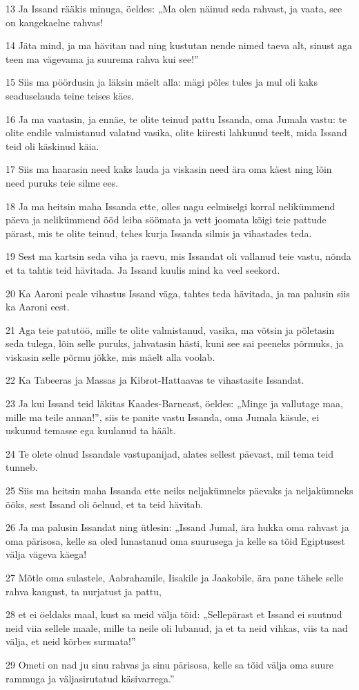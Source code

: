 \par 13 Ja Issand rääkis minuga, öeldes: „Ma olen näinud seda rahvast, ja vaata, see on kangekaelne rahvas!
\par 14 Jäta mind, ja ma hävitan nad ning kustutan nende nimed taeva alt, sinust aga teen ma vägevama ja suurema rahva kui see!”
\par 15 Siis ma pöördusin ja läksin mäelt alla: mägi põles tules ja mul oli kaks seaduselauda teine teises käes.
\par 16 Ja ma vaatasin, ja ennäe, te olite teinud pattu Issanda, oma Jumala vastu: te olite endile valmistanud valatud vasika, olite kiiresti lahkunud teelt, mida Issand teid oli käskinud käia.
\par 17 Siis ma haarasin need kaks lauda ja viskasin need ära oma käest ning lõin need puruks teie silme ees.
\par 18 Ja ma heitsin maha Issanda ette, olles nagu eelmiselgi korral nelikümmend päeva ja nelikümmend ööd leiba söömata ja vett joomata kõigi teie pattude pärast, mis te olite teinud, tehes kurja Issanda silmis ja vihastades teda.
\par 19 Sest ma kartsin seda viha ja raevu, mis Issandat oli vallanud teie vastu, nõnda et ta tahtis teid hävitada. Ja Issand kuulis mind ka veel seekord.
\par 20 Ka Aaroni peale vihastus Issand väga, tahtes teda hävitada, ja ma palusin siis ka Aaroni eest.
\par 21 Aga teie patutöö, mille te olite valmistanud, vasika, ma võtsin ja põletasin seda tulega, lõin selle puruks, jahvatasin hästi, kuni see sai peeneks põrmuks, ja viskasin selle põrmu jõkke, mis mäelt alla voolab.
\par 22 Ka Tabeeras ja Massas ja Kibrot-Hattaavas te vihastasite Issandat.
\par 23 Ja kui Issand teid läkitas Kaades-Barneast, öeldes: „Minge ja vallutage maa, mille ma teile annan!”, siis te panite vastu Issanda, oma Jumala käsule, ei uskunud temasse ega kuulanud ta häält.
\par 24 Te olete olnud Issandale vastupanijad, alates sellest päevast, mil tema teid tunneb.
\par 25 Siis ma heitsin maha Issanda ette neiks neljakümneks päevaks ja neljakümneks ööks, sest Issand oli öelnud, et ta teid hävitab.
\par 26 Ja ma palusin Issandat ning ütlesin: „Issand Jumal, ära hukka oma rahvast ja oma pärisosa, kelle sa oled lunastanud oma suurusega ja kelle sa tõid Egiptusest välja vägeva käega!
\par 27 Mõtle oma sulastele, Aabrahamile, Iisakile ja Jaakobile, ära pane tähele selle rahva kangust, ta nurjatust ja pattu,
\par 28 et ei öeldaks maal, kust sa meid välja tõid: „Sellepärast et Issand ei suutnud neid viia sellele maale, mille ta neile oli lubanud, ja et ta neid vihkas, viis ta nad välja, et neid kõrbes surmata!”
\par 29 Ometi on nad ju sinu rahvas ja sinu pärisosa, kelle sa tõid välja oma suure rammuga ja väljasirutatud käsivarrega.”


